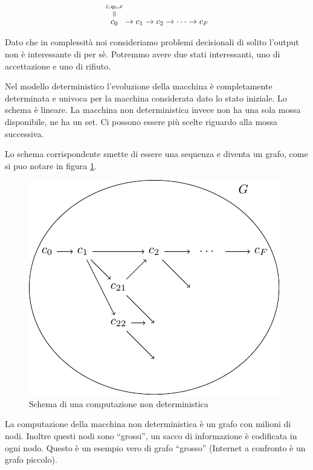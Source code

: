 \begin{equation*}
    \overequalto{c_{0}}{\varepsilon,q_{0},x} \to c_{1} \to c_{2} \to \cdots \to c_{F}
\end{equation*}

Dato che in complessità noi consideriamo problemi decisionali di solito l'output non è
interessante di per sè. Potremmo avere due stati interessanti, uno di accettazione e uno di
rifiuto.

Nel modello deterministico l'evoluzione della macchina è completamente determinata e univoca per la
macchina considerata dato lo stato iniziale. Lo schema è lineare. La macchina non deterministica
invece non ha una sola mossa disponibile, ne ha un set. Ci possono essere più scelte riguardo alla
mossa successiva.

Lo schema corrispondente smette di essere una sequenza e diventa un grafo, come si puo notare in
figura \ref{img:nondetcomp}.

\begin{figure}[h]
    \begin{center}
        \includegraphics{./img/deterministic_complexity_classes/NonDetComputation.pdf}
        \caption{Schema di una computazione non deterministica}
        \label{img:nondetcomp}
    \end{center}
\end{figure}

La computazione della macchina non deterministica è un grafo con milioni di nodi. Inoltre questi nodi
sono ``grossi'', un sacco di informazione è codificata in ogni nodo. Questo è un esempio vero di
grafo ``grosso'' (Internet a confronto è un grafo piccolo).

